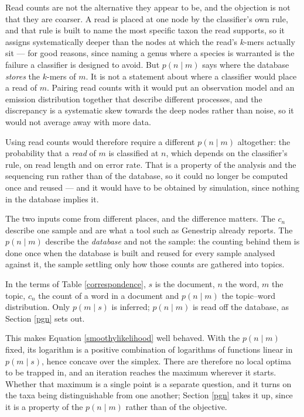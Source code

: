 \documentclass[pdflatex,sn-vancouver-num]{sn-jnl}
\begin{document}
    Read counts are not the alternative they appear to be, and the objection is not that they are
    coarser. A read is placed at one node by the classifier's own rule, and that rule is built to name
    the most specific taxon the read supports, so it assigns systematically deeper than the nodes at
    which the read's $k$-mers actually sit --- for good reasons, since naming a genus where a species
    is warranted is the failure a classifier is designed to avoid. But $p(n \mid m)$ says where the
    database \emph{stores} the $k$-mers of $m$. It is not a statement about where a classifier would
    place a read of $m$. Pairing read counts with it would put an observation model and an emission
    distribution together that describe different processes, and the discrepancy is a systematic
    skew towards the deep nodes rather than noise, so it would not average away with more data.

    Using read counts would therefore require a different $p(n \mid m)$ altogether: the probability
    that a \emph{read} of $m$ is classified at $n$, which depends on the classifier's rule, on read
    length and on error rate. That is a property of the analysis and the sequencing run rather than
    of the database, so it could no longer be computed once and reused --- and it would have to be
    obtained by simulation, since nothing in the database implies it.

    The two inputs come from different places, and the difference matters. The $c_n$ describe one
    sample and are what a tool such as Genestrip already reports. The $p(n \mid m)$ describe the
    \emph{database} and not the sample: the counting behind them is done once when the database is
    built and reused for every sample analysed against it, the sample settling only how those counts
    are gathered into topics.

    In the terms of Table \ref{correspondence}, $s$ is the document, $n$ the word, $m$ the topic,
    $c_n$ the count of a word in a document and $p(n \mid m)$ the topic--word distribution. Only
    $p(m \mid s)$ is inferred; $p(n \mid m)$ is read off the database, as Section \ref{pgn} sets out.

    This makes Equation \eqref{smoothylikelihood} well behaved. With the $p(n \mid m)$ fixed,
    its logarithm is a positive combination of logarithms of functions linear in $p(m \mid s)$, hence
    concave over the simplex. There are therefore no local optima to be trapped in, and an iteration
    reaches the maximum wherever it starts. Whether that maximum is a single point is a separate
    question, and it turns on the taxa being distinguishable from one another; Section \ref{pgn}
    takes it up, since it is a property of the $p(n \mid m)$ rather than of the objective.
\end{document}
